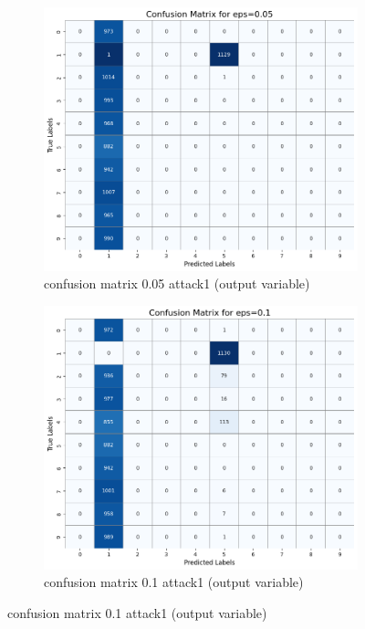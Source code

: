 \documentclass[11pt,onside]{article}
\begin{document}
\begin{figure}[h]
  \centering
  \begin{subfigure}[b]{0.49\textwidth}
    \centering
    \includegraphics[width=\textwidth]{V2_images/target_confusion_matrix_eps_0.05_attack_1.png}
    \caption{confusion matrix 0.05 attack1 (output variable)}
    \label{fig:image1}
  \end{subfigure}
  \hfill
  \begin{subfigure}[b]{0.49\textwidth}
    \centering
    \includegraphics[width=\textwidth]{V2_images/target_confusion_matrix_eps_0.1_attack_1.png}
    \caption{confusion matrix 0.1 attack1 (output variable)}
    \label{fig:image2}
  \end{subfigure}
  \label{fig:images}
\end{figure}
\end{document}
